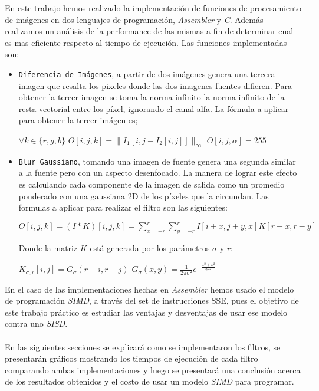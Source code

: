 \indent En este trabajo hemos realizado la implementaci\'on de funciones de procesamiento de im\'agenes en dos lenguajes de programaci\'on, \emph{Assembler} y \emph{C}. Adem\'as realizamos un an\'alisis de la performance de las mismas a fin de determinar cual es mas eficiente respecto al tiempo de ejecuci\'on. Las funciones implementadas son: \\

\begin{itemize}
	\item \texttt{Diferencia de Im\'agenes}, a partir de dos im\'agenes genera una tercera imagen que resalta los pixeles donde las dos imagenes fuentes difieren. Para obtener la tercer imagen se toma la norma infinito la norma infinito de la resta vectorial entre los píxel, ignorando el canal alfa. La f\'ormula a aplicar para obtener la tercer im\'agen es;

	\begin{center}
		$\forall k \in \{ r,g,b \} $ \hspace{10pt} $O[i, j, k] = \| I_1 [i,j - I_2 [i,j]]\| _{\infty}$ \newline
		$O[i, j, \alpha ] = 255$
	\end{center}


	\item \texttt{Blur Gaussiano}, tomando una imagen de fuente genera una segunda similar a la fuente pero con un aspecto desenfocado. La manera de lograr este efecto es calculando cada componente de la imagen de salida como un promedio ponderado con una gaussiana 2D de los píxeles que la circundan. Las formulas a aplicar para realizar el filtro son las siguientes:

	\begin{center}
		$O[i, j, k] = (I * K) [i ,j ,k] = \sum_{x=-r}^{r} \sum_{y=-r}^{r} I[i + x, j + y, x] K[r -x, r - y]$
	\end{center}

	Donde la matriz $K$ está generada por los par\'ametros $\sigma$ y $r$:

\begin{center}
		$K_{\sigma, r}[i, j] = G_{\sigma}(r - i, r - j)$ \hspace{30pt} $G_{\sigma}(x, y) = \frac{1}{2 \pi \sigma^{2}} e^{- \frac{x^2 + x^2}{2 \sigma^2}}$
	\end{center}




\end{itemize}

\indent En el caso de las implementaciones hechas en \textit{Assembler} hemos usado el modelo de programaci\'on \textit{SIMD}, a través del set de instrucciones {\ttfamily SSE}, pues el objetivo de este trabajo pr\'actico es estudiar las ventajas y desventajas de usar ese modelo contra uno \textit{SISD}.\\ \\
\indent En las siguientes secciones se explicar\'a como se implementaron los filtros, se presentar\'an gr\'aficos mostrando los tiempos de ejecuci\'on de cada filtro comparando ambas implementaciones y luego se presentar\'a una conclusi\'on acerca de los resultados obtenidos y el costo de usar un modelo \textit{SIMD} para programar.

